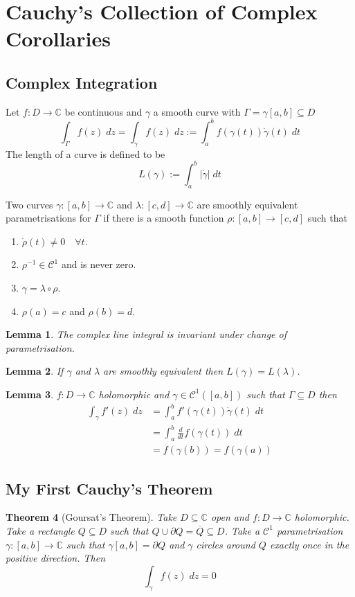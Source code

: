 \documentclass[11pt]{article}
\newcommand{\defeq}{:=}
\newcommand{\abs}[1]{\left|#1\right|}
\newcommand{\C}{\mathbb{C}}
\newenvironment{defin}
	{\begin{mdframed}[backgroundcolor=white, roundcorner=5pt, linewidth=1pt]}
	{\end{mdframed}}
\newcommand{\mdf}[1]{{\color{red} #1}}
\newtheorem{theorem}{Theorem}[section]
\newtheorem{lemma}[theorem]{Lemma}
\begin{document}
\section{Cauchy's Collection of Complex Corollaries}

\subsection{Complex Integration}
\begin{defin}
	Let $f:D\to\C$ be continuous and $\gamma$ a smooth curve with $\Gamma=\gamma[a,b]\subseteq D$
	\[
		\int_\Gamma f(z)\;dz=\int_\gamma f(z)\;dz \defeq \int_a^bf(\gamma(t))\dot{\gamma}(t)\; dt
	\]
	The length of a curve is defined to be
	\[
		L(\gamma)\defeq\int_a^b\abs{\dot{\gamma}}\; dt
	\]

	Two curves $\gamma:[a,b]\to\C$ and $\lambda:[c, d]\to\C$ are \mdf{smoothly equivalent parametrisations} for $\Gamma$ if there is a smooth  function $\rho:[a,b]\to[c, d]$ such that
	\begin{enumerate}[label=(\roman*)]
		\item $\dot{\rho}(t)\neq0 \quad \forall t$.
		\item $\rho^{-1}\in\mathcal{C}^1$ and is never zero.
		\item $\gamma = \lambda \circ \rho$.
		\item $\rho(a)=c$ and $\rho(b)=d$.
	\end{enumerate}
\end{defin}
\begin{lemma}
The complex line integral is invariant under change of parametrisation.
\end{lemma}
\begin{lemma}
If $\gamma$ and $\lambda$ are smoothly equivalent then $L(\gamma)=L(\lambda)$.
\end{lemma}

\begin{lemma}
$f:D\to \C$ holomorphic and $\gamma\in\mathcal{C}^1([a, b])$ such that $\Gamma\subseteq D$ then
\begin{align*}
	\int_\gamma f'(z)\;dz &=\int_a^b f'(\gamma(t))\dot{\gamma}(t)\;dt	\\
						  &=\int_a^b \frac{d}{dt}f(\gamma(t))\;dt \\
						  &=f(\gamma(b)) = f(\gamma(a))
\end{align*}
\end{lemma}

\subsection{My First Cauchy's Theorem}
\begin{theorem}[Goursat's Theorem]
Take $D\subseteq \C$ open and $f:D\to\C$ holomorphic.
Take a rectangle $Q\subseteq D$ such that $Q\cup \partial Q = \overline{Q}\subseteq D$.
Take a $\mathcal{C}^1$ parametrisation $\gamma:[a, b]\to\C$ such that $\gamma[a, b]=\partial Q$ and $\gamma$ circles around $Q$ exactly once in the positive direction.
Then
\[
	\int_\gamma f(z)\; dz =0
\]
\end{theorem}
\end{document}
